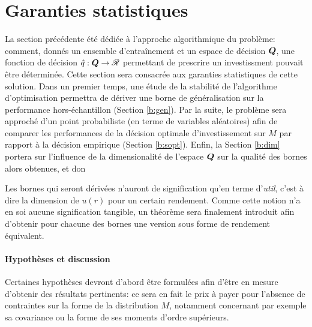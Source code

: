 \section{Garanties statistiques}


La section précédente été dédiée à l'approche algorithmique du problème: comment, donnés
un ensemble d'entraînement et un espace de décision $\bm Q$, une fonction de décision
$\hat q:\bm Q \to \mathscr{R}$ permettant de prescrire un investissment pouvait être déterminée. Cette
section sera consacrée aux garanties statistiques de cette solution. Dans un premier
temps, une étude de la stabilité de l'algorithme d'optimisation permettra de dériver une
borne de généralisation sur la performance hors-échantillon (Section \ref{b:gen}). Par la
suite, le problème sera approché d'un point probabiliste (en terme de variables
aléatoires) afin de comparer les performances de la décision optimale d'investissement sur
$M$ par rapport à la décision empirique (Section \ref{b:sopt}). Enfin, la Section
\ref{b:dim} portera sur l'influence de la dimensionalité de l'espace $\bm Q$ sur la qualité
des bornes alors obtenues, et don

Les bornes qui seront dérivées n'auront de signification qu'en terme d'\textit{util},
c'est à dire la dimension de $u(r)$ pour un certain rendement. Comme cette notion n'a en
soi aucune signification tangible, un théorème sera finalement introduit afin d'obtenir
pour chacune des bornes une version sous forme de rendement équivalent.


\paragraph{Hypothèses et discussion}

Certaines hypothèses devront d'abord être formulées afin d'être en mesure d'obtenir des
résultats pertinents: ce sera en fait le prix à payer pour l'absence de contraintes sur la
forme de la distribution $M$, notamment concernant par exemple sa covariance ou la forme
de ses moments d'ordre supérieurs.

